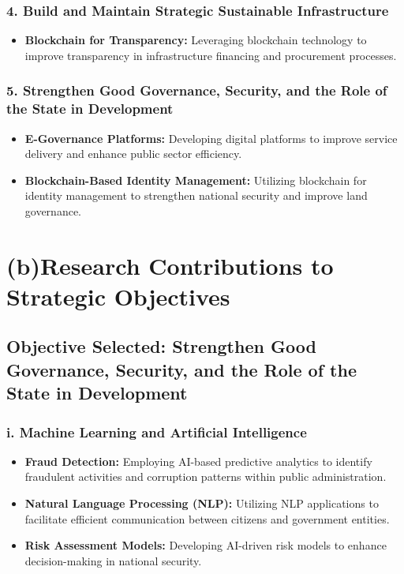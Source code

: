 \documentclass[11pt]{article}
\begin{document}
\subsubsection*{4. Build and Maintain Strategic Sustainable Infrastructure}
\begin{itemize}
    \item \textbf{Blockchain for Transparency:} Leveraging blockchain technology to improve transparency in infrastructure financing and procurement processes.
\end{itemize}

\subsubsection*{5. Strengthen Good Governance, Security, and the Role of the State in Development}
\begin{itemize}
    \item \textbf{E-Governance Platforms:} Developing digital platforms to improve service delivery and enhance public sector efficiency.
    \item \textbf{Blockchain-Based Identity Management:} Utilizing blockchain for identity management to strengthen national security and improve land governance.
\end{itemize}

\section*{(b)Research Contributions to Strategic Objectives}

\subsection*{Objective Selected: Strengthen Good Governance, Security, and the Role of the State in Development}

\subsubsection*{i. Machine Learning and Artificial Intelligence}
\begin{itemize}
    \item \textbf{Fraud Detection:} Employing AI-based predictive analytics to identify fraudulent activities and corruption patterns within public administration.
    \item \textbf{Natural Language Processing (NLP):} Utilizing NLP applications to facilitate efficient communication between citizens and government entities.
    \item \textbf{Risk Assessment Models:} Developing AI-driven risk models to enhance decision-making in national security.
\end{itemize}
\end{document}
